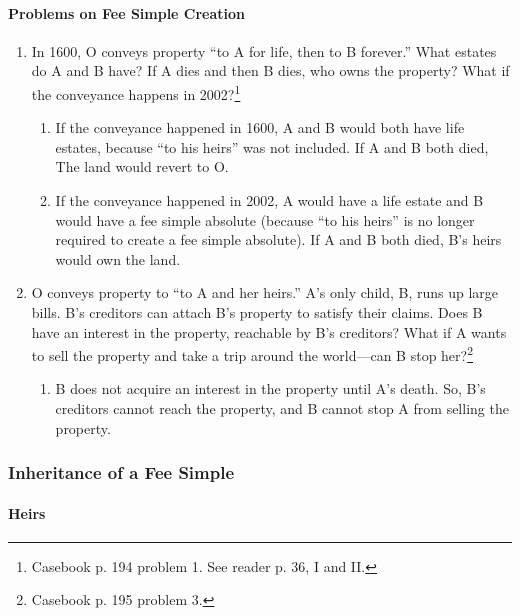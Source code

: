 \paragraph{Problems on Fee Simple Creation}

\begin{enumerate}
    \item In 1600, O conveys property ``to A for life, then to B forever.'' 
    What estates do A and B have? If A dies and then B dies, who owns the 
    property? What if the conveyance happens in 2002?\footnote{Casebook p. 194 
    problem 1. See reader p. 36, I and II.}
    \begin{enumerate}
        \item If the conveyance happened in 1600, A and B would both have life 
        estates, because ``to his heirs'' was not included. If A and B both 
        died, The land would revert to O.
        \item If the conveyance happened in 2002, A would have a life estate 
        and B would have a fee simple absolute (because ``to his heirs'' is no 
        longer required to create a fee simple absolute). If A and B both 
        died, B's heirs would own the land.
    \end{enumerate}
    \item O conveys property to ``to A and her heirs.'' A's only child, B, 
    runs up large bills. B's creditors can attach B's property to satisfy 
    their claims. Does B have an interest in the property, reachable by B's 
    creditors? What if A wants to sell the property and take a trip around the 
    world---can B stop her?\footnote{Casebook p. 195 problem 3.}
    \begin{enumerate}
        \item B does not acquire an interest in the property until A's death. 
        So, B's creditors cannot reach the property, and B cannot stop A from 
        selling the property.
    \end{enumerate}

\end{enumerate}

\subsubsection{Inheritance of a Fee Simple}

\paragraph{Heirs}

